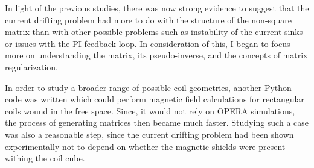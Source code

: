


In light of the previous studies, there was now strong evidence to
suggest that the current drifting problem had more to do with the
structure of the non-square matrix than with other possible problems
such as instability of the current sinks or issues with the PI
feedback loop.  In consideration of this, I began to focus more on
understanding the matrix, its pseudo-inverse, and the concepts of
matrix regularization.

In order to study a broader range of possible coil geometries, another
Python code was written which could perform magnetic field
calculations for rectangular coils wound in the free space.  Since, it would not
rely on OPERA simulations, the process of generating matrices then
became much faster.  Studying such a case was also a reasonable step,
since the current drifting problem had been shown experimentally not
to depend on whether the magnetic shields were present withing the
coil cube.

